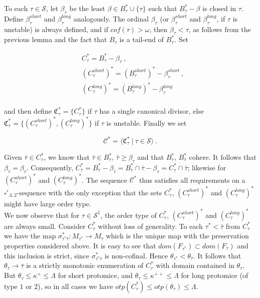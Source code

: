 \documentclass[12pt]{article}
\begin{document}
 
 To each $\tau \in \mathcal{S}$, let $\beta_\tau$ be the least $\beta \in B_\tau^* \cup \{ \tau \}$ such that $B_\tau^* - \beta$ is closed in $\tau$.  Define $\beta_\tau^{short}$ and $\beta_\tau^{long}$ analogously.  The ordinal $\beta_\tau$ (or $\beta_\tau^{short}$ and $\beta_\tau^{long}$, if $\tau$ is unstable) is always defined, and if $cof( \tau) > \omega$, then $\beta_\tau < \tau$, as follows from the previous lemma and the fact that $B_\tau$ is a tail-end of $B_\tau^*$.  Set
 
\[
\begin{split}
& C_\tau^* = B_\tau^* - \beta_\tau \ ,\\
& (C_\tau^{short})^* = (B_\tau^{short})^* - \beta_\tau^{short} \ ,\\
& (C_\tau^{long})^* = (B_\tau^{long})^* - \beta_\tau^{long}\\
\end{split}
\]
 
and then define $\mathfrak{C}^*_\tau = \{ C_\tau^* \}$ if $\tau$ has a single canonical divisor, else $\mathfrak{C}^*_\tau = \{ (C_\tau^{short})^* , (C_\tau^{long})^* \}$ if $\tau$ is unstable.  Finally we set
 
 \[
  \mathcal{C}^* = \langle \mathfrak{C}^*_\tau \ | \ \tau \in \mathcal{S} \rangle \ .
 \]
 
 Given $\bar{\tau} \in C_\tau^*$, we know that $\bar{\tau} \in B_\tau^*$, $\bar{\tau} \geq \beta_\tau$ and that $B_\tau^*$, $B_{\bar{\tau}}^*$ cohere.  It follows that $\beta_{\bar{\tau}} = \beta_\tau$.  Consequently, $C_{\bar{\tau}}^* = B_{\bar{\tau}}^* - \beta_{\bar{\tau}} = B_\tau^* \cap \bar{\tau} - \beta_\tau = C_\tau^* \cap \bar{\tau}$; likewise for $(C_\tau^{short})^*$ and $(C_\tau^{long})^*$.  The sequence $\mathcal{C}^*$ thus satisfies all requirements on a $\square'_{\Lambda , 2}$-sequence with the only exception that the sets $C_\tau^*$, $(C_\tau^{short})^*$ and $(C_\tau^{long})^*$ might have large order type.\\

We now observe that for $\tau \in \mathcal{S}^1$, the order type of $C_\tau^*$, $(C_\tau^{short})^*$ and $(C_\tau^{long})^*$ are always small.  Consider $C_\tau^*$ without loss of generality.  To each $\tau^* < \bar{\tau}$ from $C_\tau^*$ we have the map $\sigma_{\tau^* \bar{\tau} }^* : M_{\tau^*} \longrightarrow M_{\bar{\tau}}$ which is the unique map with the preservation properties considered above.  It is easy to see that $dom(F_{\tau^*}) \subset dom( F_{\bar{\tau}})$ and this inclusion is strict, since $\sigma_{\tau^* \bar{\tau} }^*$ is non-cofinal.  Hence $\theta_{\tau^*} < \theta_{\bar{\tau}}$.  It follows that $\theta_{\bar{\tau}} \longrightarrow \bar{\tau}$ is a strictly monotonic enumeration of $C_\tau^*$ with domain contained in $\theta_\tau$.  But $\theta_\tau \leq \kappa^+ \leq \Lambda$ for short protomice, and $\theta_\tau \leq \kappa^{++} \leq \Lambda$ for long protomice (of type $1$ or $2$), so in all cases we have $otp(C_\tau^*) \leq otp ( \theta_\tau) \leq \Lambda$.\\
\end{document}

